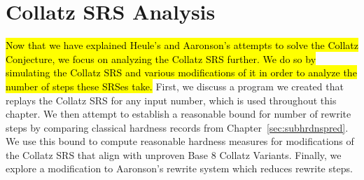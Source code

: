 

\chapter{Collatz SRS Analysis} \label{sec:hardnessrewriterules}
\hl{Now that we have explained Heule's and Aaronson's attempts to solve the Collatz Conjecture, we focus on analyzing the Collatz SRS further. We do so by simulating the Collatz SRS and various modifications of it in order to analyze the number of steps these SRSes take.} First, we discuss a program we created that replays the Collatz SRS for any input number, which is used throughout this chapter. We then attempt to establish a reasonable bound for number of rewrite steps by comparing classical hardness records from Chapter~\ref{sec:subhrdnspred}. We use this bound to compute reasonable hardness measures for modifications of the Collatz SRS that align with unproven Base 8 Collatz Variants. Finally, we explore a modification to Aaronson's rewrite system which reduces rewrite steps.
